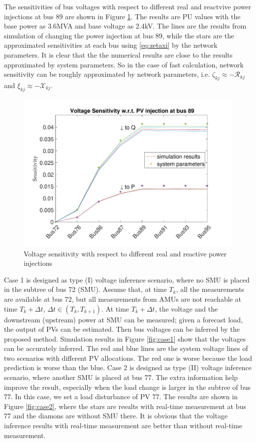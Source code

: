 \documentclass{article}
\begin{document}
The sensitivities of bus voltages with respect to different real and reactvive power injections at bus 89 are shown in Figure \ref{fig:sens89}. The results are PU values with the base power as 3.6MVA and base voltage as 2.4kV. The lines are the results from simulation of changing the power injection at bus 89, while the stars are the approximated sensitivities at each bus using \eqref{eq:zetaxi} by the network parameters. It is clear that the the numerical results are close to the results approximated by system parameters. So in the case of fast calculation, network sensitivity can be roughly approximated by network parameters, i.e. $\zeta_{kj} \approx -\mathcal{R}_{kj} $ and $ \xi_{kj}\approx -\mathcal{X}_{kj}$. 
\begin{figure}[h!]
    \centering
    \includegraphics[width=\linewidth]{pics/sensitivity.pdf}
    \caption{Voltage sensitivity with respect to different real and reactive power injections}
    \label{fig:sens89}
\end{figure}

Case 1 is designed as type (I) voltage inference scenario, where no SMU is placed in the subtree of bus 72 (SMU). Assume that, at time $T_k$, all the measurements are available at bus 72, but all measurements from AMUs are not reachable at time $T_k+\Delta t$, $\Delta t \in (T_k ,T_{k+1})$. At time $T_k+\Delta t$, the voltage and the downstream (upstream) power at SMU can be measured; given a forecast load, the output of PVs can be estimated. Then bus voltages can be inferred by the proposed method. Simulation results in Figure \ref{fig:case1} show that the voltages can be accurately inferred. The red and blue lines are the system voltage lines of two scenarios with different PV allocations. The red one is worse because the load prediction is worse than the blue.  Case 2 is designed as type (II) voltage inference scenario, where another SMU is placed at bus 77. The extra information help improve the result, especially when the load change is larger in the subtree of bus 77. In this case, we set a load disturbance of PV 77. The results are shown in Figure \ref{fig:case2}, where the stars are results with real-time measurement at bus 77 and the diamons are without SMU there. It is obvious that the voltage inference results with real-time measurement are better than without real-time measurement. 
\end{document}
